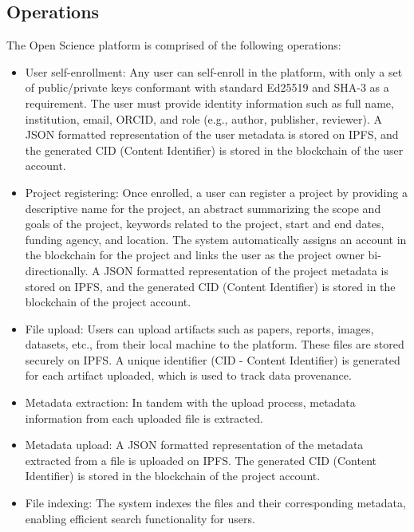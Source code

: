 \documentclass{article}
\begin{document}
\subsection{Operations}

The Open Science platform is comprised of the following operations:

\begin{itemize}
    \item User self-enrollment:
          \indent Any user can self-enroll in the platform, with only a set of public/private keys conformant with standard Ed25519 and SHA-3 as a requirement. The user must provide identity information such as full name, institution, email, ORCID, and role (e.g., author, publisher, reviewer). A JSON formatted representation of the user metadata is stored on IPFS, and the generated CID (Content Identifier) is stored in the blockchain of the user account.

    \item Project registering:
          \indent Once enrolled, a user can register a project by providing a descriptive name for the project, an abstract summarizing the scope and goals of the project, keywords related to the project, start and end dates, funding agency, and location. The system automatically assigns an account in the blockchain for the project and links the user as the project owner bi-directionally. A JSON formatted representation of the project metadata is stored on IPFS, and the generated CID (Content Identifier) is stored in the blockchain of the project account.

    \item File upload:
          \indent Users can upload artifacts such as papers, reports, images, datasets, etc., from their local machine to the platform. These files are stored securely on IPFS. A unique identifier (CID - Content Identifier) is generated for each artifact uploaded, which is used to track data provenance.

    \item Metadata extraction:
          \indent In tandem with the upload process, metadata information from each uploaded file is extracted.

    \item Metadata upload:
          \indent A JSON formatted representation of the metadata extracted from a file is uploaded on IPFS. The generated CID (Content Identifier) is stored in the blockchain of the project account.

    \item File indexing:
          \indent The system indexes the files and their corresponding metadata, enabling efficient search functionality for users.


\end{itemize}
\end{document}
